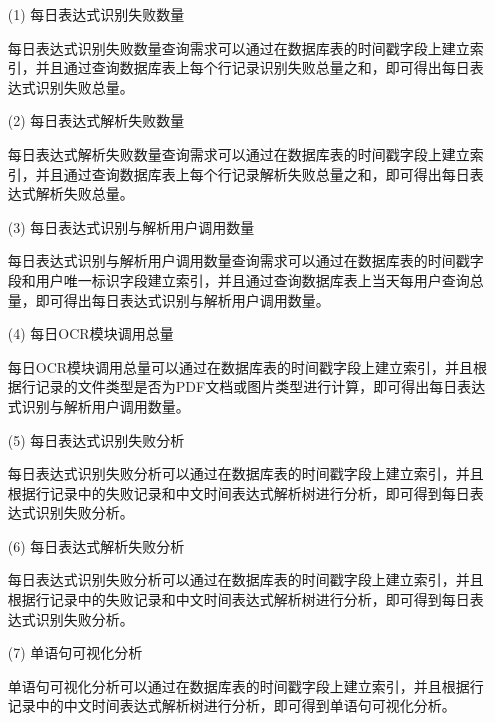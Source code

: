 \begin{enumerate}
  \item[(1)] 每日表达式识别失败数量

    每日表达式识别失败数量查询需求可以通过在数据库表的时间戳字段上建立索引，并且通过查询数据库表上每个行记录识别失败总量之和，即可得出每日表达式识别失败总量。

  \item[(2)] 每日表达式解析失败数量

    每日表达式解析失败数量查询需求可以通过在数据库表的时间戳字段上建立索引，并且通过查询数据库表上每个行记录解析失败总量之和，即可得出每日表达式解析失败总量。

  \item[(3)] 每日表达式识别与解析用户调用数量

    每日表达式识别与解析用户调用数量查询需求可以通过在数据库表的时间戳字段和用户唯一标识字段建立索引，并且通过查询数据库表上当天每用户查询总量，即可得出每日表达式识别与解析用户调用数量。

  \item[(4)] 每日OCR模块调用总量

    每日OCR模块调用总量可以通过在数据库表的时间戳字段上建立索引，并且根据行记录的文件类型是否为PDF文档或图片类型进行计算，即可得出每日表达式识别与解析用户调用数量。

  \item[(5)] 每日表达式识别失败分析

    每日表达式识别失败分析可以通过在数据库表的时间戳字段上建立索引，并且根据行记录中的失败记录和中文时间表达式解析树进行分析，即可得到每日表达式识别失败分析。

  \item[(6)] 每日表达式解析失败分析

    每日表达式识别失败分析可以通过在数据库表的时间戳字段上建立索引，并且根据行记录中的失败记录和中文时间表达式解析树进行分析，即可得到每日表达式识别失败分析。

  \item[(7)] 单语句可视化分析

    单语句可视化分析可以通过在数据库表的时间戳字段上建立索引，并且根据行记录中的中文时间表达式解析树进行分析，即可得到单语句可视化分析。
\end{enumerate}

